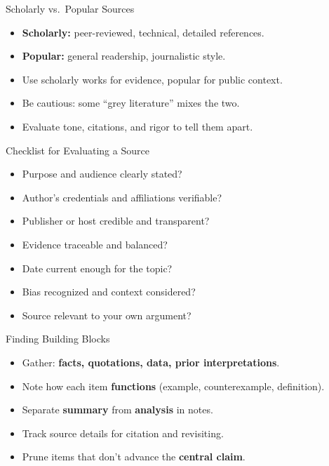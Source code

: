 \documentclass[aspectratio=169]{beamer}
\begin{document}
\begin{frame}{Scholarly vs.\ Popular Sources}
\begin{itemize}
  \item \textbf{Scholarly:} peer-reviewed, technical, detailed references.
  \item \textbf{Popular:} general readership, journalistic style.
  \item Use scholarly works for evidence, popular for public context.
  \item Be cautious: some “grey literature” mixes the two.
  \item Evaluate tone, citations, and rigor to tell them apart.
\end{itemize}
\end{frame}

\begin{frame}{Checklist for Evaluating a Source}
\begin{itemize}
  \item Purpose and audience clearly stated?
  \item Author’s credentials and affiliations verifiable?
  \item Publisher or host credible and transparent?
  \item Evidence traceable and balanced?
  \item Date current enough for the topic?
  \item Bias recognized and context considered?
  \item Source relevant to your own argument?
\end{itemize}
\end{frame}

\begin{frame}{Finding Building Blocks}
\begin{itemize}
  \item Gather: \textbf{facts, quotations, data, prior interpretations}.
  \item Note how each item \textbf{functions} (example, counterexample, definition).
  \item Separate \textbf{summary} from \textbf{analysis} in notes.
  \item Track source details for citation and revisiting.
  \item Prune items that don’t advance the \textbf{central claim}.
\end{itemize}
\end{frame}
\end{document}
